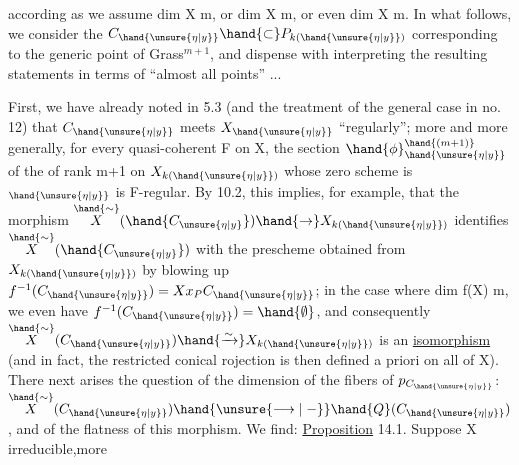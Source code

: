 
according as we assume dim X \hand{$\geqslant$} m, or dim X \hand{$\leqslant$} m, or even dim X \hand{$<$} m.
In what follows, we consider the $C_{\hand{\unsure{\eta|y}}}\hand{\subset} P_{k(\hand{\unsure{\eta|y}})}$ corresponding to the
generic point  of Grass$^{m+1}$, and dispense with interpreting
the resulting statements in terms of “almost all points” ...

First, we have already noted in 5.3 (and the treatment of the
general case in no. 12) that $C_{\hand{\unsure{\eta|y}}}$ meets $X_{\hand{\unsure{\eta|y}}}$ “regularly”; more
 and more generally, for every quasi-coherent F on X,
the section $\hand{\phi}_{\hand{\unsure{\eta|y}}}^{\hand{(m+1)}}$ of the  of rank m+1 on $X_{k(\hand{\unsure{\eta|y}})}$ whose
zero scheme is $_{\hand{\unsure{\eta|y}}}$  is F-regular. By 10.2, this
implies, for example, that the morphism $\overset{\hand{\sim}}{X}(\hand{C_{\unsure{\eta|y}}})\hand{\to} X_{k(\hand{\unsure{\eta|y}})}$ identifies $\overset{\hand{\sim}}{X}(\hand{C_{\unsure{\eta|y}}})$ with the prescheme
obtained from $X_{k(\hand{\unsure{\eta|y}})}$ by blowing up $f^{-1}(C_{\hand{\unsure{\eta|y}}})= Xx_P C_{\hand{\unsure{\eta|y}}}$;  in the case
where dim f(X) \hand{$\leqslant$} m, we even have $f^{-1}(C_{\hand{\unsure{\eta|y}}}) = \hand{\emptyset}$, and consequently
$\overset{\hand{\sim}}{X}(C_{\hand{\unsure{\eta|y}}}) \hand{\xrightarrow{\sim}} X_{k(\hand{\unsure{\eta|y}})}$ is an \uline{isomorphism} (and in fact, the restricted conical rojection
is then defined a priori on all of X). There next arises
the question of the dimension of the fibers of $p_{C_{\hand{\unsure{\eta|y}}}}$: $\overset{\hand{\sim}}{X}(C_{\hand{\unsure{\eta|y}}}) \hand{\unsure{\longrightarrow|\relbar}} \hand{Q}(C_{\hand{\unsure{\eta|y}}})$,
and of the flatness of this morphism. We find:
\uline{Proposition} 14.1.  Suppose X irreducible,more
